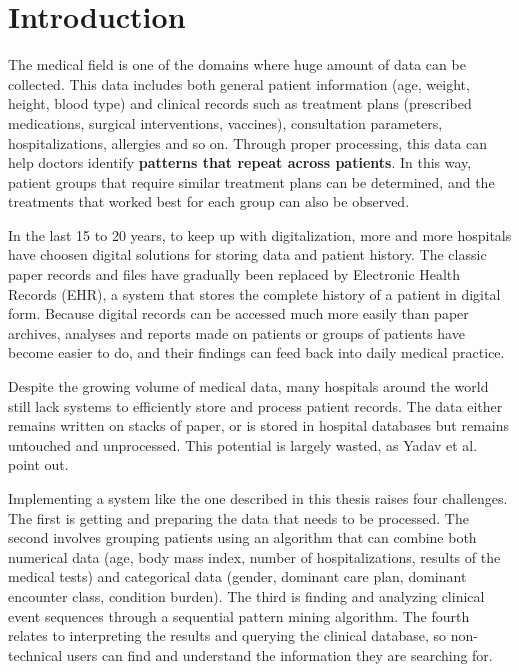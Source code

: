 \chapter{Introduction}\label{ch:introduction}

\pagestyle{fancy}

The medical field is one of the domains where huge amount of data can be collected.
This data includes both general patient information (age, weight, height, blood type) and clinical records such as treatment plans (prescribed medications, surgical interventions, vaccines), consultation parameters, hospitalizations, allergies and so on.
Through proper processing, this data can help doctors identify \textbf{patterns that repeat across patients}.
In this way, patient groups that require similar treatment plans can be determined, and the treatments that worked best for each group can also be observed.

In the last 15 to 20 years, to keep up with digitalization, more and more hospitals have choosen digital solutions for storing data and patient history.
The classic paper records and files have gradually been replaced by Electronic Health Records (EHR), a system that stores the complete history of a patient in digital form.
Because digital records can be accessed much more easily than paper archives, analyses and reports made on patients or groups of patients have become easier to do, and their findings can feed back into daily medical practice.

Despite the growing volume of medical data, many hospitals around the world still lack systems to efficiently store and process patient records.
The data either remains written on stacks of paper, or is stored in hospital databases but remains untouched and unprocessed.
This potential is largely wasted, as Yadav et al.~\cite{Yadav2018MiningEHR} point out.

Implementing a system like the one described in this thesis raises four challenges.
The first is getting and preparing the data that needs to be processed.
The second involves grouping patients using an algorithm that can combine both numerical data (age, body mass index, number of hospitalizations, results of the medical tests) and categorical data (gender, dominant care plan, dominant encounter class, condition burden).
The third is finding and analyzing clinical event sequences through a sequential pattern mining algorithm.
The fourth relates to interpreting the results and querying the clinical database, so non-technical users can find and understand the information they are searching for.

